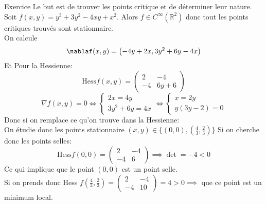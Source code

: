 \begin{parag}{Exercice}
    Le  but est de trouver les points critique et de déterminer leur nature.\\
    Soit $f\left(x, y\right) = y^3 + 3y^2 - 4xy + x^2$. Alors $f \in C^{\infty}\left(\mathbb{R}^2\right)$ donc tout les points critiques trouvés sont stationnaire.\\
    On calcule
    \begin{equation*} \nablaf\left(x, y\right) = \left(-4y + 2x, 3y^2 + 6y - 4x\right) \end{equation*}
    Et Pour la Hessienne:
    \begin{equation*} \text{Hess} f\left(x, y\right) = \begin{pmatrix} 2 & -4 \\ -4 & 6y + 6 \end{pmatrix} \end{equation*}
    \begin{equation*} \nabla f\left(x, y\right) = 0 \iff \begin{cases} 2x = 4y \\ 3y^2 + 6y = 4x \end{cases} \iff \begin{cases} x = 2y \\ y\left(3y - 2\right) = 0\end{cases} \end{equation*} 
    Donc si on remplace ce qu'on trouve dans la Hessienne:\\
    On étudie donc les points stationnaire $\left(x, y\right) \in \{\left(0, 0\right), \left( \frac{4}{3},\frac{2}{3}\right)\}$
    Si on cherche donc les points selles:
    \begin{equation*} \text{Hess} f\left(0, 0\right) = \begin{pmatrix}2 & -4 \\ -4 & 6\end{pmatrix} \implies \det = -4 < 0 \end{equation*}
    Ce qui implique que le point $\left(0, 0\right)$ est un point selle.\\
    Si on prends donc Hess $f\left(\frac{4}{3}, \frac{2}{3}\right) = \begin{pmatrix} 2 & -4 \\ -4 & 10\end{pmatrix} = 4 > 0 \implies$ que ce point est un minimum local.
   

\end{parag}



       
       



